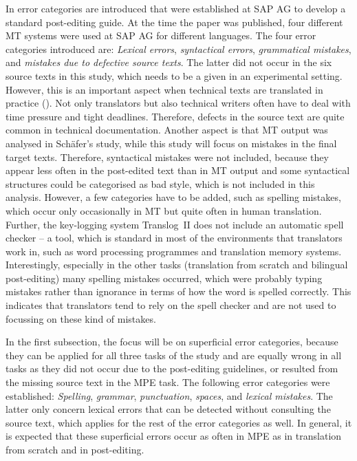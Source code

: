 \documentclass[output=paper]{langsci/langscibook}
\begin{document}
In \citet{Schafer2003} error categories are introduced that were established at SAP AG to develop a standard post-editing guide. At the time the paper was published, four different MT systems were used at SAP AG for different languages. The four error categories introduced are: \textit{Lexical errors}, \textit{syntactical errors}, \textit{grammatical mistakes}, and \textit{mistakes due to defective source texts}. The latter did not occur in the six source texts in this study, which needs to be a given in an experimental setting. However, this is an important aspect when technical texts are translated in practice (\citealt{hornhelf1999, hornhelf2007}). Not only translators but also technical writers often have to deal with time pressure and tight deadlines. Therefore, defects in the source text are quite common in technical documentation. Another aspect is that MT output was analysed in Schäfer's study, while this study will focus on mistakes in the final target texts. Therefore, syntactical mistakes were not included, because they appear less often in the post-edited text than in MT output and some syntactical structures could be categorised as bad style, which is not included in this analysis. However, a few categories have to be added, such as spelling mistakes, which occur only occasionally in MT but quite often in human translation. Further, the key-logging system Translog~II does not include an automatic spell checker -- a tool, which is standard in most of the environments that translators work in, such as word processing programmes and translation memory systems. Interestingly, especially in the other tasks (translation from scratch and bilingual post-editing) many spelling mistakes occurred, which were probably typing mistakes rather than ignorance in terms of how the word is spelled correctly. This indicates that translators tend to rely on the spell checker and are not used to focussing on these kind of mistakes.



In the first subsection, the focus will be on superficial error categories, because they can be applied for all three tasks of the study and are equally wrong in all tasks as they did not occur due to the post-editing guidelines, or resulted from the missing source text in the MPE task. The following error categories were established: \textit{Spelling},\textit{ grammar}, \textit{punctuation}, \textit{spaces}, and \textit{lexical mistakes}. The latter only concern lexical errors that can be detected without consulting the source text, which applies for the rest of the error categories as well. In general, it is expected that these superficial errors occur as often in MPE as in translation from scratch and in post-editing.
\end{document}
